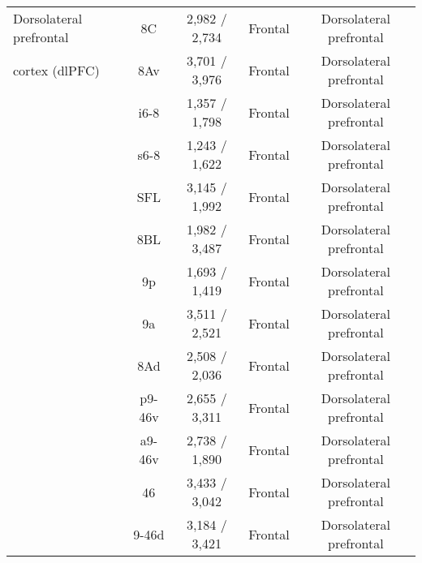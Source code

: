 \begin{table*}[ht]
{\begin{tabular}{ l | c | c | c | c }
      \midrule

      Dorsolateral prefrontal                 & 8C                  & 2,982 / 2,734     & Frontal       & Dorsolateral prefrontal       \\
      cortex (dlPFC)                          & 8Av                 & 3,701 / 3,976     & Frontal       & Dorsolateral prefrontal       \\
                                              & i6-8                & 1,357 / 1,798     & Frontal       & Dorsolateral prefrontal       \\
                                              & s6-8                & 1,243 / 1,622     & Frontal       & Dorsolateral prefrontal       \\
                                              & SFL                 & 3,145 / 1,992     & Frontal       & Dorsolateral prefrontal       \\
                                              & 8BL                 & 1,982 / 3,487     & Frontal       & Dorsolateral prefrontal       \\
                                              & 9p                  & 1,693 / 1,419     & Frontal       & Dorsolateral prefrontal       \\
                                              & 9a                  & 3,511 / 2,521     & Frontal       & Dorsolateral prefrontal       \\
                                              & 8Ad                 & 2,508 / 2,036     & Frontal       & Dorsolateral prefrontal       \\
                                              & p9-46v              & 2,655 / 3,311     & Frontal       & Dorsolateral prefrontal       \\
                                              & a9-46v              & 2,738 / 1,890     & Frontal       & Dorsolateral prefrontal       \\
                                              & 46                  & 3,433 / 3,042     & Frontal       & Dorsolateral prefrontal       \\
                                              & 9-46d               & 3,184 / 3,421     & Frontal       & Dorsolateral prefrontal       \\

      \midrule


\end{tabular}}
\end{table*}
